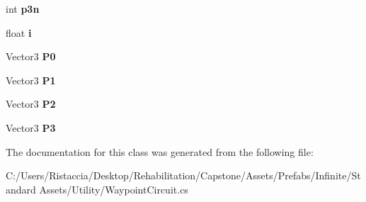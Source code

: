 \begin{DoxyCompactItemize}
int {\bfseries p3n}
\item 
\mbox{\label{class_unity_standard_assets_1_1_utility_1_1_waypoint_circuit_a8290cf3abcaffd39e5d984b7f1e324c3}} 
float {\bfseries i}
\item 
\mbox{\label{class_unity_standard_assets_1_1_utility_1_1_waypoint_circuit_aab5ca00123610644bda31940045a6f3b}} 
Vector3 {\bfseries P0}
\item 
\mbox{\label{class_unity_standard_assets_1_1_utility_1_1_waypoint_circuit_a93521562647a586983ff8d98d61c72a7}} 
Vector3 {\bfseries P1}
\item 
\mbox{\label{class_unity_standard_assets_1_1_utility_1_1_waypoint_circuit_a7162457d330297598e305093f7cd7c0b}} 
Vector3 {\bfseries P2}
\item 
\mbox{\label{class_unity_standard_assets_1_1_utility_1_1_waypoint_circuit_abd8b3ce769b0e8f70d91be2ab6f073ee}} 
Vector3 {\bfseries P3}
\end{DoxyCompactItemize}


The documentation for this class was generated from the following file\+:\begin{DoxyCompactItemize}
\item 
C\+:/\+Users/\+Ristaccia/\+Desktop/\+Rehabilitation/\+Capstone/\+Assets/\+Prefabs/\+Infinite/\+Standard Assets/\+Utility/Waypoint\+Circuit.\+cs\end{DoxyCompactItemize}
